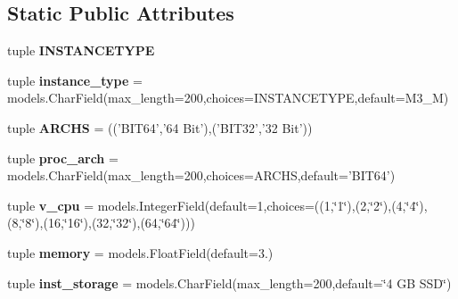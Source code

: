\subsection*{Static Public Attributes}
\begin{DoxyCompactItemize}
\item 
tuple {\bfseries I\-N\-S\-T\-A\-N\-C\-E\-T\-Y\-P\-E}
\item 
\hypertarget{classec2__spot__price__monitor_1_1models_1_1InstanceType_a313ccf8412d359c4332b904445d80d90}{tuple {\bfseries instance\-\_\-type} = models.\-Char\-Field(max\-\_\-length=200,choices=I\-N\-S\-T\-A\-N\-C\-E\-T\-Y\-P\-E,default=M3\-\_\-\-M)}\label{classec2__spot__price__monitor_1_1models_1_1InstanceType_a313ccf8412d359c4332b904445d80d90}

\item 
\hypertarget{classec2__spot__price__monitor_1_1models_1_1InstanceType_a036d98591b945c757acef63481e66de1}{tuple {\bfseries A\-R\-C\-H\-S} = (('B\-I\-T64','64 Bit'),('B\-I\-T32','32 Bit'))}\label{classec2__spot__price__monitor_1_1models_1_1InstanceType_a036d98591b945c757acef63481e66de1}

\item 
\hypertarget{classec2__spot__price__monitor_1_1models_1_1InstanceType_a3cfd65deb71a1efa49e15a3e1716764e}{tuple {\bfseries proc\-\_\-arch} = models.\-Char\-Field(max\-\_\-length=200,choices=A\-R\-C\-H\-S,default='B\-I\-T64')}\label{classec2__spot__price__monitor_1_1models_1_1InstanceType_a3cfd65deb71a1efa49e15a3e1716764e}

\item 
\hypertarget{classec2__spot__price__monitor_1_1models_1_1InstanceType_ac0a355afe44aed1ad4e59f2427963b64}{tuple {\bfseries v\-\_\-cpu} = models.\-Integer\-Field(default=1,choices=((1,\char`\"{}1\char`\"{}),(2,\char`\"{}2\char`\"{}),(4,\char`\"{}4\char`\"{}),(8,\char`\"{}8\char`\"{}),(16,\char`\"{}16\char`\"{}),(32,\char`\"{}32\char`\"{}),(64,\char`\"{}64\char`\"{})))}\label{classec2__spot__price__monitor_1_1models_1_1InstanceType_ac0a355afe44aed1ad4e59f2427963b64}

\item 
\hypertarget{classec2__spot__price__monitor_1_1models_1_1InstanceType_ad9c33c77f434cd395809d7068e993ff1}{tuple {\bfseries memory} = models.\-Float\-Field(default=3.)}\label{classec2__spot__price__monitor_1_1models_1_1InstanceType_ad9c33c77f434cd395809d7068e993ff1}

\item 
\hypertarget{classec2__spot__price__monitor_1_1models_1_1InstanceType_a959a545b2b55dd65638ce346ba34b92b}{tuple {\bfseries inst\-\_\-storage} = models.\-Char\-Field(max\-\_\-length=200,default=\char`\"{}4 G\-B S\-S\-D\char`\"{})}\label{classec2__spot__price__monitor_1_1models_1_1InstanceType_a959a545b2b55dd65638ce346ba34b92b}


\end{DoxyCompactItemize}
